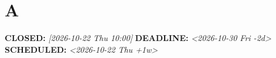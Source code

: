 \documentclass[11pt]{article}
\author{root}
\date{\today}
\title{}
\begin{document}
\tableofcontents

\section{A}
\label{sec:orgf0e0f19}
\noindent\textbf{CLOSED:} \textit{[2026-10-22 Thu 10:00] } \textbf{DEADLINE:} \textit{<2026-10-30 Fri -2d>} \textbf{SCHEDULED:} \textit{<2026-10-22 Thu +1w> }\\[0pt]
\end{document}
